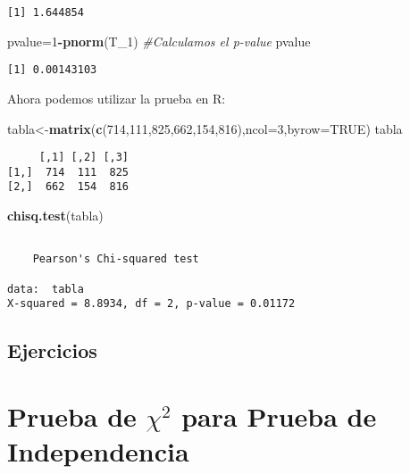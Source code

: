 \documentclass[a4paper,oneside,openany]{book}
\newenvironment{Shaded}{\begin{snugshade}}{\end{snugshade}}
\newcommand{\KeywordTok}[1]{\textcolor[rgb]{0.13,0.29,0.53}{\textbf{#1}}}
\newcommand{\DataTypeTok}[1]{\textcolor[rgb]{0.13,0.29,0.53}{#1}}
\newcommand{\DecValTok}[1]{\textcolor[rgb]{0.00,0.00,0.81}{#1}}
\newcommand{\CommentTok}[1]{\textcolor[rgb]{0.56,0.35,0.01}{\textit{#1}}}
\newcommand{\OtherTok}[1]{\textcolor[rgb]{0.56,0.35,0.01}{#1}}
\newcommand{\OperatorTok}[1]{\textcolor[rgb]{0.81,0.36,0.00}{\textbf{#1}}}
\newcommand{\NormalTok}[1]{#1}
\begin{document}
\begin{verbatim}
[1] 1.644854
\end{verbatim}

\begin{Shaded}
\begin{Highlighting}[]
\NormalTok{pvalue=}\DecValTok{1}\OperatorTok{-}\KeywordTok{pnorm}\NormalTok{(T_}\DecValTok{1}\NormalTok{)  }\CommentTok{#Calculamos el p-value}
\NormalTok{pvalue}
\end{Highlighting}
\end{Shaded}

\begin{verbatim}
[1] 0.00143103
\end{verbatim}

Ahora podemos utilizar la prueba en R:

\begin{Shaded}
\begin{Highlighting}[]
\NormalTok{tabla<-}\KeywordTok{matrix}\NormalTok{(}\KeywordTok{c}\NormalTok{(}\DecValTok{714}\NormalTok{,}\DecValTok{111}\NormalTok{,}\DecValTok{825}\NormalTok{,}\DecValTok{662}\NormalTok{,}\DecValTok{154}\NormalTok{,}\DecValTok{816}\NormalTok{),}\DataTypeTok{ncol=}\DecValTok{3}\NormalTok{,}\DataTypeTok{byrow=}\OtherTok{TRUE}\NormalTok{)}
\NormalTok{tabla}
\end{Highlighting}
\end{Shaded}

\begin{verbatim}
     [,1] [,2] [,3]
[1,]  714  111  825
[2,]  662  154  816
\end{verbatim}

\begin{Shaded}
\begin{Highlighting}[]
\KeywordTok{chisq.test}\NormalTok{(tabla)}
\end{Highlighting}
\end{Shaded}

\begin{verbatim}

    Pearson's Chi-squared test

data:  tabla
X-squared = 8.8934, df = 2, p-value = 0.01172
\end{verbatim}

\section{Ejercicios}\label{ejercicios-9}

\chapter{\texorpdfstring{Prueba de \(\chi^2\) para Prueba de
Independencia}{Prueba de \textbackslash{}chi\^{}2 para Prueba de Independencia}}\label{prueba-de-chi2-para-prueba-de-independencia}
\end{document}
